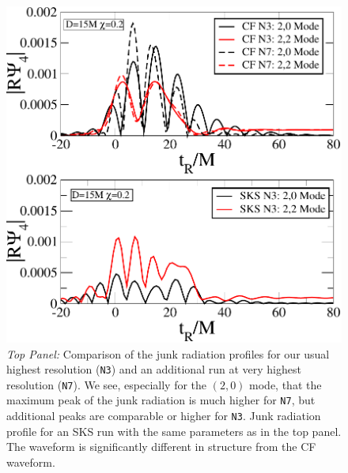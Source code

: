 \begin{figure}
  \includegraphics[scale=0.95]{chap5/HighResComparison}
  \caption[Junk radiation profiles for CF and SKS initial data, and a
  comparison to high resolution SKS initial data.]{{\it Top Panel:} Comparison of the junk radiation profiles for our usual
    highest resolution ({\tt N3}) and an additional run at very highest
    resolution ({\tt N7}). We see, especially for the $(2,0)$ mode, that the
    maximum peak of the junk radiation is much higher for {\tt  N7}, but
    additional peaks are comparable or higher for {\tt N3}.  Junk radiation profile for an SKS run with the
    same parameters as in the top panel. The waveform is significantly
    different in structure from the CF waveform.
}
  \label{fig:HighResComparison}
\end{figure}

